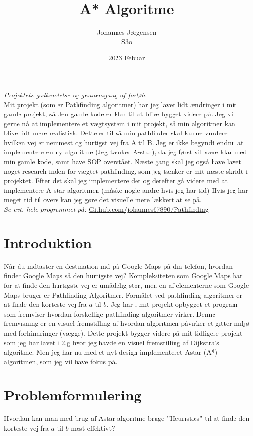\documentclass[12pt]{article}
\begin{document}
\title{A* Algoritme}
\author{Johannes Jørgensen\\ S3o}
\date{2023 Febuar}
\maketitle
\textit{Projektets godkendelse og gennemgang af forløb.}\\
Mit projekt (som er Pathfinding algoritmer) har jeg lavet lidt ændringer i mit gamle projekt, så den gamle kode er klar til at blive bygget videre på. Jeg vil gerne nå at implementere et vægtsystem i mit projekt, så min algoritmer kan blive lidt mere realistisk. Dette er til så min pathfinder skal kunne vurdere hvilken vej er nemmest og hurtigst vej fra A til B. Jeg er ikke begyndt endnu at implementere en ny algoritme (Jeg tænker A-star), da jeg først vil være klar med min gamle kode, samt have SOP overstået.  
Næste gang skal jeg også have lavet noget research inden for vægtet pathfinding, som jeg tænker er mit næste skridt i projektet. 
Efter det skal jeg implementere det og derefter gå videre med at implementere A-star algoritmen (måske nogle andre hvis jeg har tid)
Hvis jeg har meget tid til overs kan jeg gøre det visuelle mere lækkert at se på. \\
\textit{Se evt. hele programmet på:} \href{https://github.com/johannes67890/Pathfinding.git}{Github.com/johannes67890/Pathfinding} 
\tableofcontents
\pagebreak

\section{Introduktion}
Når du indtaster en destination ind på Google Maps på din telefon, hvordan finder Google Maps så den hurtigste vej? Kompleksiteten som Google Maps har for at finde den hurtigste vej er umådelig stor, men en af elementerne som Google Maps bruger er Pathfinding Algoritmer. Formålet ved pathfinding algoritmer er at finde den korteste vej fra $a$ til $b$.
Jeg har i mit projekt opbygget et program som fremviser hvordan forskellige pathfinding algoritmer virker. Denne fremvisning er en visuel fremstilling af hvordan algoritmen påvirker et gitter miljø med forhindringer (vægge). Dette projekt bygger videre på mit tidligere projekt som jeg har lavet i 2.g hvor jeg havde en visuel fremstilling af Dijkstra’s algoritme. Men jeg har nu med et nyt design implementeret Astar (A*) algoritmen, som jeg vil have fokus på.

\section{Problemformulering}
Hvordan kan man med brug af Astar algoritme bruge ”Heuristics” til at finde den korteste vej fra $a$ til $b$ mest effektivt?
\end{document}
